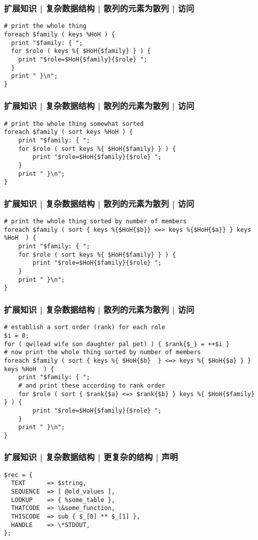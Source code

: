 \begin{frame}[fragile]
  \frametitle{扩展知识 | 复杂数据结构 | 散列的元素为散列 | 访问}
\begin{lstlisting}
# print the whole thing
foreach $family ( keys %HoH ) {
  print "$family: { ";
  for $role ( keys %{ $HoH{$family} } ) {
    print "$role=$HoH{$family}{$role} ";
  }
  print " }\n";
}
\end{lstlisting}
\end{frame}

\begin{frame}[fragile]
  \frametitle{扩展知识 | 复杂数据结构 | 散列的元素为散列 | 访问}
\begin{lstlisting}
# print the whole thing somewhat sorted
foreach $family ( sort keys %HoH ) {
    print "$family: { ";
    for $role ( sort keys %{ $HoH{$family} } ) {
        print "$role=$HoH{$family}{$role} ";
    }
    print " }\n";
}
\end{lstlisting}
\end{frame}

\begin{frame}[fragile]
  \frametitle{扩展知识 | 复杂数据结构 | 散列的元素为散列 | 访问}
\begin{lstlisting}
# print the whole thing sorted by number of members
foreach $family ( sort { keys %{$HoH{$b}} <=> keys %{$HoH{$a}} } keys %HoH  ) {
    print "$family: { ";
    for $role ( sort keys %{ $HoH{$family} } ) {
        print "$role=$HoH{$family}{$role} ";
    }
    print " }\n";
}
\end{lstlisting}
\end{frame}

\begin{frame}[fragile]
  \frametitle{扩展知识 | 复杂数据结构 | 散列的元素为散列 | 访问}
\begin{lstlisting}
# establish a sort order (rank) for each role
$i = 0;
for ( qw(lead wife son daughter pal pet) ) { $rank{$_} = ++$i }
# now print the whole thing sorted by number of members
foreach $family ( sort { keys %{ $HoH{$b}  } <=> keys %{ $HoH{$a} } } keys %HoH  ) {
    print "$family: { ";
    # and print these according to rank order
    for $role ( sort { $rank{$a} <=> $rank{$b} } keys %{ $HoH{$family} } ) {
        print "$role=$HoH{$family}{$role} ";
    }
    print " }\n";
}
\end{lstlisting}
\end{frame}

\begin{frame}[fragile]
  \frametitle{扩展知识 | 复杂数据结构 | 更复杂的结构 | 声明}
\begin{lstlisting}
$rec = {
  TEXT      => $string,
  SEQUENCE  => [ @old_values ],
  LOOKUP    => { %some_table },
  THATCODE  => \&some_function,
  THISCODE  => sub { $_[0] ** $_[1] },
  HANDLE    => \*STDOUT,
};
\end{lstlisting}
\end{frame}


